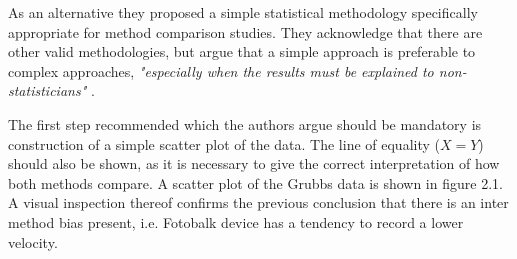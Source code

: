 \documentclass[Chap2main.tex]{subfiles}
\begin{document}
	As an alternative they proposed a simple statistical methodology specifically appropriate for method comparison studies. They
	acknowledge that there are other valid methodologies, but argue that a simple approach is preferable to complex approaches,
	\emph{"especially when the results must be explained to non-statisticians"} \citep*{BA83}.
	
	The first step recommended which the authors argue should be mandatory is construction of a simple scatter plot of the data.
	The line of equality ($X=Y$) should also be shown, as it is necessary to give the correct interpretation of how both methods
	compare. A scatter plot of the Grubbs data is shown in figure 2.1. A visual inspection thereof confirms the previous conclusion that
	there is an inter method bias present, i.e. Fotobalk device has a tendency to record a lower velocity.
	
	
\end{document}

